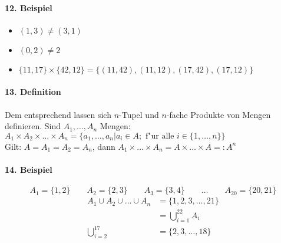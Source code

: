 \paragraph{12. Beispiel}
\begin{itemize}
	\item $(1,3)\neq(3,1)$
	\item $(0,2)\neq2$
	\item $\{11,17\}\times\{42,12\}=\{(11,42), (11,12), (17,42), (17,12)\}$
\end{itemize}

\paragraph{13. Definition} \parskp
Dem entsprechend lassen sich $n$-Tupel und $n$-fache Produkte von Mengen definieren. Sind $A_1,\dots,A_n$ Mengen: $A_1\times A_2\times\dots\times A_n=\{a_1,\dots,a_n|a_i\in A;\text{ f"ur alle }i\in\{1,\dots,n\}\}$\\
Gilt: $A=A_1=A_2=A_n$, dann $A_1\times\dots\times A_n=A\times\dots\times A=:A^n$

\paragraph{14. Beispiel}
\[
A_1=\{1,2\}\qquad A_2=\{2,3\}\qquad A_3=\{3,4\}\qquad \dots\qquad A_20=\{20,21\}
\]
\begin{align*}
	A_1\cup A_2\cup\dots\cup A_n&=\{1,2,3,\dots,21\}\\
	&=\bigcup_{i=1}^{22}A_i\\
	\bigcup_{i=2}^{17}&=\{2,3,\dots,18\}
\end{align*}

